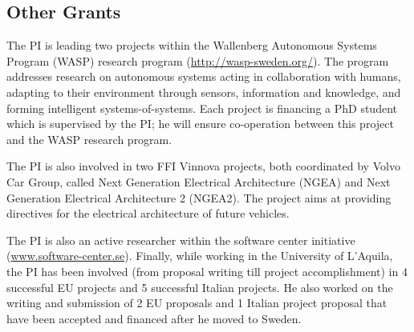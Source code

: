 \documentclass[12pt]{article}
\newcommand{\nb}[2]{
    \fcolorbox{gray}{yellow}{\bfseries\sffamily\scriptsize#1}
    {\sf\small$\blacktriangleright$\textit{#2}$\blacktriangleleft$}
   }
\newcommand{\nb}[2]{}
\newcommand\patrizio[1]{\nb{Patrizio}{#1}}
\begin{document}
\vspace{-.4cm}

\subsection{Other Grants}
\vspace{-.3cm}
The PI is leading two projects within the Wallenberg Autonomous Systems Program (WASP) research program ({\small \url{http://wasp-sweden.org/}}). The program addresses research on autonomous systems acting in collaboration with humans, adapting to their environment through sensors, information and knowledge, and forming intelligent systems-of-systems. %
Each project is financing a PhD student which is supervised by the PI; he will ensure co-operation between this project and the WASP research program.

The PI is also involved in two FFI Vinnova projects, both coordinated by Volvo Car Group, called Next Generation Electrical Architecture (NGEA) and Next Generation Electrical Architecture 2 (NGEA2). The project aims at providing directives for the electrical architecture of future vehicles. 


The PI is also an active researcher within the software center initiative ({\small \url{www.software-center.se}}).
Finally, while working in the University of L'Aquila, the PI has been involved (from proposal writing till project accomplishment) in 4 successful EU projects and 5 successful Italian projects. He also worked on the writing and submission of  2 EU proposals and 1 Italian project proposal that have been accepted and financed after he moved to Sweden.

\end{document}
